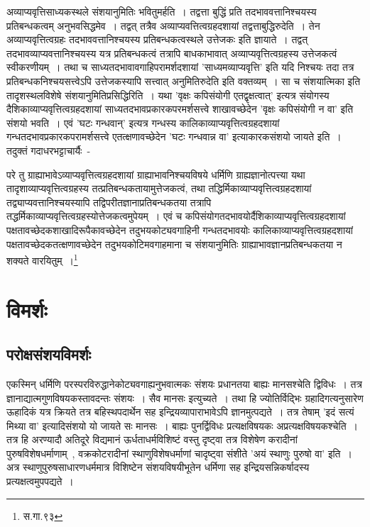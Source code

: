 		अव्याप्यवृत्तिसाध्यकस्थले संशयानुमितिः भवितुमर्हति~। तद्वत्ता बुद्धिं प्रति तदभाववत्तानिश्चयस्य प्रतिबन्धकत्वम् अनुभवसिद्धमेव~। तद्वत् तत्रैव अव्याप्यवत्तित्वग्रहदशायां तद्वत्ताबुद्धिरुदेति~। तेन अव्याप्यवृत्तित्वग्रहः तदभाववत्तानिश्चयस्य प्रतिबन्धकत्वस्थले उत्तेजकः इति ज्ञायाते~। तद्वत् तदभावव्याप्यवत्तानिश्चयस्य यत्र प्रतिबन्धकत्वं तत्रापि बाधकाभावात् अव्याप्यवृत्तित्वग्रहस्य उत्तेजकत्वं स्वीकरणीयम्~। तथा च साध्यतदभावावगाहिपरामर्शदशायां 'साध्यमव्याप्यवृत्ति' इति यदि निश्चयः तदा तत्र प्रतिबन्धकनिश्चयसत्त्वेऽपि उत्तेजकस्यापि सत्त्वात् अनुमितिरुदेति इति वक्तव्यम्~। सा च संशयात्मिका इति तादृशस्थलविशेषे संशयानुमितिप्रसिद्धिरिति~। यथा 'वृक्षः कपिसंयोगी एतद्वृक्षत्वात्' इत्यत्र संयोगस्य दैशिकाव्याप्यवृत्तित्वग्रहदशायां साध्यतदभावप्रकारकपरमर्शसत्त्वे शाखावच्छेदेन 'वृक्षः कपिसंयोगी न वा' इति संशयो भवति~। एवं 'घटः गन्धवान्' इत्यत्र गन्धस्य कालिकाव्याप्यवृत्तित्वग्रहदशायां गन्धतदभावप्रकारकपरामर्शसत्त्वे एतत्क्षणावच्छेदेन 'घटः गन्धवान्न वा' इत्याकारकसंशयो जायते इति~। तदुक्तं गदाधरभट्टाचार्यैः~-

		{\fontsize{11.7}{0}\selectfont\s परे तु ग्राह्याभावेऽव्याप्यवृत्तित्वग्रहदशायां ग्राह्याभावनिश्चयविषये धर्मिणि ग्राह्यज्ञानोत्पत्त्या यथा तादृशाव्याप्यवृत्तित्वग्रहस्य तत्प्रतिबन्धकतायामुत्तेजकत्वं, तथा तद्धिर्मिकाव्याप्यवृत्तित्वग्रहदशायां तद्व्याप्यवत्तानिश्चयस्यापि तद्विपरीतज्ञानाप्रतिबन्धकतया तत्रापि तद्धर्मिकाव्याप्यवृत्तित्वग्रहस्योत्तेजकत्वमुपेयम्~। एवं च कपिसंयोगतदभावयोर्दैशिकाव्याप्यवृत्तित्वग्रहदशायां पक्षतावच्छेदकशाखादिरूपैकावच्छेदेन तदुभयकोट्यवगाहिनी गन्धतदभावयोः कालिकाव्याप्यवृत्तित्वग्रहदशायां पक्षतावच्छेदकतत्क्षणावच्छेदेन तदुभयकोटिमवगाहमाना च संशयानुमितिः ग्राह्याभावज्ञानप्रतिबन्धकतया न शक्यते वारयितुम्~।\footnote{स.गा.९३}}


	\section{विमर्शः}

		\subsection{परोक्षसंशयविमर्शः}

		एकस्मिन् धर्मिणि परस्परविरुद्धानेकोट्यवगाह्यनुभवात्मकः संशयः प्रधानतया बाह्यः मानसश्चेति द्विविधः~। तत्र ज्ञानाद्यात्मगुणविषयकस्तावदन्तः संशयः~। सैव मानसः इत्युच्यते~। तथा हि ज्योतिर्विद्भिः ग्रहादिगत्यनुसारेण ऊहादिकं यत्र क्रियते तत्र बहिस्थपदार्थेन सह इन्द्रियव्यापाराभावेऽपि ज्ञानमुत्पद्यते~। तत्र तेषाम् 'इदं सत्यं मिथ्या वा' इत्यादिसंशयो यो जायते सः मानसः~। बाह्यः पुनर्द्विविधः प्रत्यक्षविषयकः अप्रत्यक्षविषयकश्चेति~। तत्र हि अरण्यादौ अतिदूरे विद्यमानं ऊर्धताधर्मविशिष्टं वस्तु दृष्ट्वा तत्र विशेषेण करादीनां पुरुषविशेषधर्माणाम्~, वक्रकोटरादीनां स्थाणुविशेषधर्माणां चादृष्ट्वा संशीते 'अयं स्थाणुः पुरुषो वा' इति~। अत्र स्थाणुपुरुषसाधारणधर्ममात्र विशिष्टेन संशयविषयीभूतेन धर्मिणा सह इन्द्रियसन्निकर्षादस्य प्रत्यक्षत्वमुपपद्यते~।

